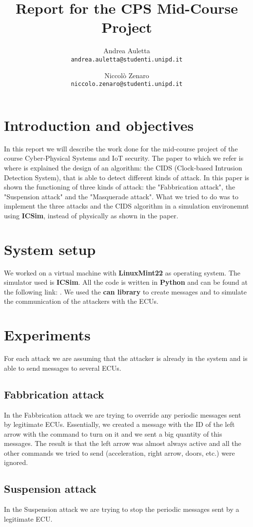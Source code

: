 \documentclass[12pt]{article}
\title{Report for the CPS Mid-Course Project}
\author{
    Andrea Auletta \\ \texttt{andrea.auletta@studenti.unipd.it} \and
    Niccolò Zenaro \\ \texttt{niccolo.zenaro@studenti.unipd.it}
}
\begin{document}
\maketitle
\newpage
\tableofcontents
\newpage

\section{Introduction and objectives}
In this report we will describe the work done for the mid-course project of the course Cyber-Physical Systems and IoT security. 
The paper to which we refer is \textbf{\cite{Cho2016} } where is explained the design of an algorithm: the CIDS (Clock-based Intrusion Detection System), that is able to detect different kinds of attack. In this paper is shown the functioning of three kinds of attack: the "Fabbrication attack", the "Suspension attack" and the "Masquerade attack". What we tried to do was to implement the three attacks and the CIDS algorithm in a simulation environemnt using \textbf{ICSim}, instead of physically as shown in the paper.
\section{System setup}
We worked on a virtual machine with \textbf{LinuxMint22} as operating system.
The simulator used is \textbf{ICSim}. All the code is written in \textbf{Python} and can be found at the following link: .%
We used the \textbf{can library} to create messages and to simulate the communication of the attackers with the ECUs.
\section{Experiments}
For each attack we are assuming that the attacker is already in the system and is able to send messages to several ECUs.
\subsection{Fabbrication attack}
In the Fabbrication attack we are trying to override any periodic messages sent by legitimate ECUs. Essentially, we created a message with the ID of the left arrow with the command to turn on it and we sent a big quantity of this messages. The result is that the left arrow was almost always active and all the other commands we tried to send (acceleration, right arrow, doors, etc.) were ignored.
\subsection{Suspension attack}
In the Suspension attack we are trying to stop the periodic messages sent by a legitimate ECU. 
\end{document}
